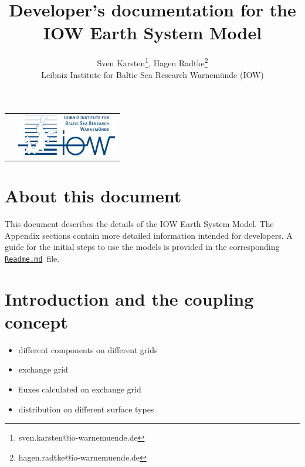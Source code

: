 \documentclass[a4paper,titlepage]{scrartcl}
\title{Developer's documentation for the IOW Earth System Model}
\author{Sven Karsten\thanks{sven.karsten@io-warnemuende.de}, Hagen Radtke\thanks{hagen.radtke@io-warnemuende.de} \\ Leibniz Institute for Baltic Sea Research Warnem\"unde (IOW)}
\begin{document}
\sffamily
\setlength{\parskip}{0.5em}
\setlength{\parindent}{0.0em}

\begin{tabular}{>{\raggedright\arraybackslash}p{} >{\raggedleft\arraybackslash}p{}}
& \href{https://www.io-warnemuende.de}{\includegraphics[height=5em]{logo_iow_englisch_rgb.jpg}} 
\end{tabular}

\vspace*{5em}
{\let\newpage\relax\maketitle}

\newcommand{\Sec}[1]{Sec.~\ref{#1}}
\newcommand{\Readme}{\href{https://git.io-warnemuende.de/iow_esm/main}{\texttt{Readme.md}}\ }

\section*{About this document}
This document describes the details of the IOW Earth System Model. The Appendix sections contain more detailed information intended for developers. 
A guide for the initial steps to use the models is provided in the corresponding \Readme file.

\vfill 

\newpage

\renewcommand{\contentsname}{Table of Contents\\ \vspace{2cm}}
\tableofcontents

\newpage

\section{Introduction and the coupling concept}
\begin{itemize}
\item different components on different grids
\item exchange grid
\item fluxes calculated on exchange grid
\item distribution on different surface types
\end{itemize}
\end{document}
